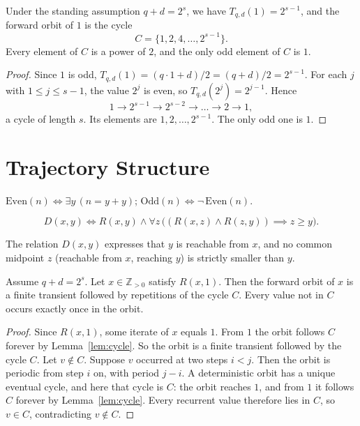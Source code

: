 \documentclass[runningheads]{llncs}
\begin{document}
\begin{lemma}\label{lem:cycle}
Under the standing assumption $q+d = 2^s$, we have $T_{q,d}(1) =
2^{s-1}$, and the forward orbit of $1$ is the cycle
\[
C = \{1, 2, 4, \dots, 2^{s-1}\}.
\]
Every element of $C$ is a power of $2$, and the only odd element of $C$
is $1$.
\end{lemma}
\begin{proof}
Since $1$ is odd, $T_{q,d}(1) = (q\cdot 1 + d)/2 = (q+d)/2 = 2^{s-1}$.
For each $j$ with $1 \le j \le s-1$, the value $2^{j}$ is even, so
$T_{q,d}(2^{j}) = 2^{j-1}$. Hence
\[
1 \to 2^{s-1} \to 2^{s-2} \to \dots \to 2 \to 1,
\]
a cycle of length $s$. Its elements are $1,2,\dots,2^{s-1}$. The only
odd one is $1$.
\end{proof}
\section{Trajectory Structure}
\label{sec:trajectory}

\begin{definition}[Parity]\label{def:parity}
$\mathrm{Even}(n) \iff \exists y\,(n = y+y)$; \quad
$\mathrm{Odd}(n) \iff \neg\,\mathrm{Even}(n)$.
\end{definition}

\begin{definition}\label{def:reachable_floor}
\[
D(x,y) \iff R(x,y) \land \forall z\,\bigl( (R(x,z) \land R(z,y))
\implies z \ge y \bigr).
\]
\end{definition}

The relation $D(x,y)$ expresses that $y$ is reachable from $x$, and no common midpoint $z$ (reachable from $x$, reaching $y$) is strictly smaller than $y$. 

\begin{lemma}\label{lem:single_visit}
Assume $q+d = 2^s$. Let $x \in \mathbb{Z}_{>0}$ satisfy $R(x,1)$. Then
the forward orbit of $x$ is a finite transient followed by repetitions
of the cycle $C$. Every value not in $C$ occurs exactly once in the
orbit.
\end{lemma}
\begin{proof}
Since $R(x,1)$, some iterate of $x$ equals $1$. From $1$ the orbit
follows $C$ forever by Lemma~\ref{lem:cycle}. So the orbit is a finite
transient followed by the cycle $C$. Let $v \notin C$. Suppose $v$ occurred at two steps $i < j$. Then the orbit is periodic
from step $i$ on, with period $j-i$. A deterministic orbit has a unique
eventual cycle, and here that cycle is $C$: the orbit reaches $1$, and
from $1$ it follows $C$ forever by Lemma~\ref{lem:cycle}. Every recurrent
value therefore lies in $C$, so $v \in C$, contradicting $v \notin C$.
\end{proof}
\end{document}
